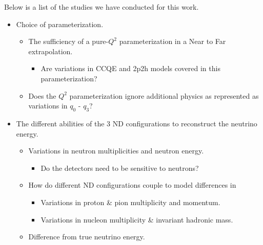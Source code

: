 \documentclass[12pt]{article}
\begin{document}
Below is a list of the studies we have conducted for this work.
\begin{itemize}
\item Choice of parameterization.
	\begin{itemize}
	\item The sufficiency of a pure-$Q^2$ parameterization in a Near to Far extrapolation.
		\begin{itemize}
			\item Are variations in CCQE and 2p2h models covered in this parameterization?
		\end{itemize} 
	\item Does the $Q^2$ parameterization ignore additional physics as represented as variations in
	 $q_0 \textrm{ - } q_3$?

	\end{itemize}
\item The different abilities of the 3 ND configurations to reconstruct the neutrino energy.
	\begin{itemize}
	\item Variations in neutron multiplicities and neutron energy.
	\begin{itemize}
			\item Do the detectors need to be sensitive to neutrons?
	\end{itemize} 
	\item How do different ND configurations couple to model differences in 
	\begin{itemize}
		\item Variations in proton \& pion multiplicity and momentum.
		\item Variations in nucleon multiplicity \& invariant hadronic mass.
	\end{itemize} 
	\item Difference from true neutrino energy.
	\end{itemize}


\end{itemize}
\end{document}
